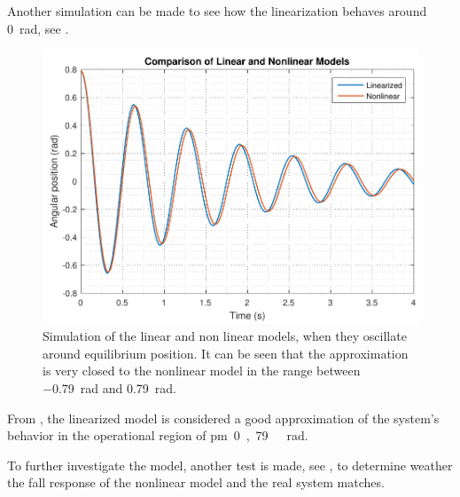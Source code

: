 Another simulation can be made to see how the linearization behaves around \SI{0}{rad}, see .
%
\begin{figure}[H] 
	\centering 
	\includegraphics[scale=0.6]{figures/LinearizedVSNonlinear_0}
	\caption{Simulation of the linear and non linear models, when they oscillate around equilibrium position. It can be seen that the approximation is very closed to the nonlinear model in the range between \SI{-0,79}{rad} and \SI{0,79}{rad}.}
	\label{LinearizedVSNonlinear_0}
\end{figure}\vspace{-18pt}
%
From , the linearized model is considered a good approximation of the system's behavior in the operational region of \si{\pm 0,79\ rad}.

To further investigate the model, another test is made, see , to determine weather the fall response of the nonlinear model and the real system matches.

